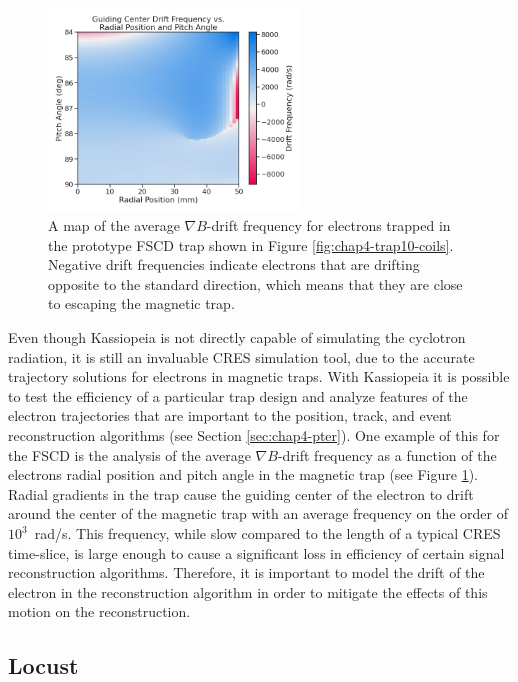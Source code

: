 \begin{figure}[htbp]
    \centering
    \includegraphics[width=0.6\textwidth]{figs/Chapter-4/230220_gradb_drift_frequencies.png}
    \caption{A map of the average $\nabla B$-drift frequency for electrons trapped in the prototype FSCD trap shown in Figure \ref{fig:chap4-trap10-coils}. Negative drift frequencies indicate electrons that are drifting opposite to the standard direction, which means that they are close to escaping the magnetic trap.}
    \label{fig:chap4-gradb-drift-frequency-map}
\end{figure}

Even though Kassiopeia is not directly capable of simulating the cyclotron radiation, it is still an invaluable CRES simulation tool, due to the accurate trajectory solutions for electrons in magnetic traps. With Kassiopeia it is possible to test the efficiency of a particular trap design and analyze features of the electron trajectories that are important to the position, track, and event reconstruction algorithms (see Section \ref{sec:chap4-pter}). One example of this for the FSCD is the analysis of the average $\nabla B$-drift frequency as a function of the electrons radial position and pitch angle in the magnetic trap (see Figure \ref{fig:chap4-gradb-drift-frequency-map}). Radial gradients in the trap cause the guiding center of the electron to drift around the center of the magnetic trap with an average frequency on the order of $10^3$~rad/s. This frequency, while slow compared to the length of a typical CRES time-slice, is large enough to cause a significant loss in efficiency of certain signal reconstruction algorithms. Therefore, it is important to model the drift of the electron in the reconstruction algorithm in order to mitigate the effects of this motion on the reconstruction.

\subsection{Locust}

